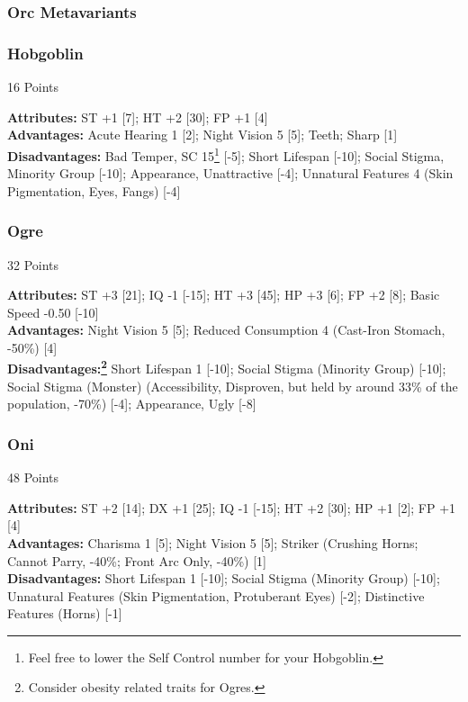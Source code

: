 \begin{multicols*}{3}
	\subsubsection{Orc Metavariants}
	
	\subsubsection*{Hobgoblin}
	\begin{flushright}
		16 Points
	\end{flushright}
	\textbf{Attributes:} 
	ST +1 [7]; HT +2 [30]; FP +1 [4]
	\\\textbf{Advantages:} 
	Acute Hearing 1 [2]; Night Vision 5 [5]; Teeth; Sharp [1]
	\\\textbf{Disadvantages:} 
	Bad Temper, SC 15\footnote{Feel free to lower the Self Control number for your Hobgoblin.} [-5]; Short Lifespan [-10]; Social Stigma, Minority Group [-10]; Appearance, Unattractive [-4]; Unnatural Features 4 (Skin Pigmentation, Eyes, Fangs) [-4]
	
	\subsubsection*{Ogre}
	\begin{flushright}
		32 Points
	\end{flushright}
	\textbf{Attributes:} 
	ST +3 [21]; IQ -1 [-15]; HT +3 [45]; HP +3 [6]; FP +2 [8]; Basic Speed -0.50 [-10]
	\\\textbf{Advantages:} 
	Night Vision 5 [5]; Reduced Consumption 4 (Cast-Iron Stomach, -50\%) [4]
	\\\textbf{Disadvantages:\footnote{Consider obesity related traits for Ogres.}} 
	Short Lifespan 1 [-10]; Social Stigma (Minority Group) [-10]; Social Stigma (Monster) (Accessibility, Disproven, but held by around 33\% of the population, -70\%) [-4]; Appearance, Ugly [-8]
	
	\subsubsection*{Oni}
	\begin{flushright}
		48 Points
	\end{flushright}
	\textbf{Attributes:} 
	ST +2 [14]; DX +1 [25]; IQ -1 [-15]; HT +2 [30]; HP +1 [2]; FP +1 [4]
	\\\textbf{Advantages:} 
	Charisma 1 [5]; Night Vision 5 [5]; Striker (Crushing Horns; Cannot Parry, -40\%; Front Arc Only, -40\%) [1]
	\\\textbf{Disadvantages:} 
	Short Lifespan 1 [-10]; Social Stigma (Minority Group) [-10]; Unnatural Features (Skin Pigmentation, Protuberant Eyes) [-2]; Distinctive Features (Horns) [-1]
	

\end{multicols*}
